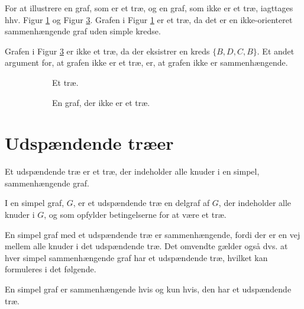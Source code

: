 \begin{exmp}
For at illustrere en graf, som er et træ, og en graf, som ikke er et træ, iagttages hhv. Figur \ref{eksempel_tree} og Figur \ref{eksempel_notree}. Grafen i Figur \ref{eksempel_tree} er et træ, da det er en ikke-orienteret sammenhængende graf uden simple kredse.

Grafen i Figur \ref{eksempel_notree} er ikke et træ, da der eksistrer en kreds $\lbrace B, D, C, B \rbrace$. 
Et andet argument for, at grafen ikke er et træ, er, at grafen ikke er sammenhængende.
\end{exmp}

\begin{figure}[h]
\centering
	\begin{subfigure}{0.5\textwidth}
		\centering
			\scalebox{0.9}{}
		\caption{Et træ.} 
		\label{eksempel_tree}
	\end{subfigure}%
	\begin{subfigure}{0.5\textwidth}
		\centering		
			\scalebox{0.9}{}
		\caption{En graf, der ikke er et træ.} 
		\label{eksempel_notree}
	\end{subfigure}
\caption{}
\end{figure}

\section{Udspændende træer}

Et udspændende træ er et træ, der indeholder alle knuder i en simpel, sammenhængende graf.

\begin{defn}
I en simpel graf, $G$, er et udspændende træ en delgraf af $G$, der indeholder alle knuder i $G$, og som opfylder betingelserne for at være et træ.
\end{defn}

En simpel graf med et udspændende træ er sammenhængende, fordi der er en vej mellem alle knuder i det udspændende træ.
Det omvendte gælder også dvs. at hver simpel sammenhængende graf har et udspændende træ, hvilket kan formuleres i det følgende.

\begin{thm}
En simpel graf er sammenhængende hvis og kun hvis, den har et udspændende træ.
\end{thm}

